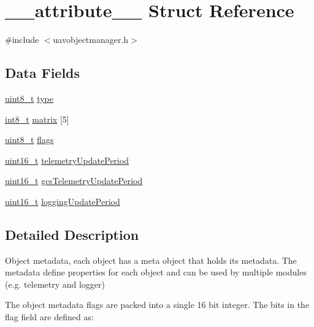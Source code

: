 \hypertarget{struct____attribute____}{\section{\-\_\-\-\_\-attribute\-\_\-\-\_\- Struct Reference}
\label{struct____attribute____}
}


{\ttfamily \#include $<$uavobjectmanager.\-h$>$}

\subsection*{Data Fields}
\begin{DoxyCompactItemize}
\item 
\hyperlink{stdint_8h_aba7bc1797add20fe3efdf37ced1182c5}{uint8\-\_\-t} \hyperlink{struct____attribute_____a30e60959661cf2e3b2dcc52e5d3e9249}{type}
\item 
\hyperlink{stdint_8h_ad566f6541e98b74246db1a3a3a85ad49}{int8\-\_\-t} \hyperlink{struct____attribute_____a443b6e5347cb65e8a297b596be99e467}{matrix} \mbox{[}5\mbox{]}
\item 
\hyperlink{stdint_8h_aba7bc1797add20fe3efdf37ced1182c5}{uint8\-\_\-t} \hyperlink{struct____attribute_____a2c5106312c60da8340d95ea8f201e8f2}{flags}
\item 
\hyperlink{stdint_8h_a273cf69d639a59973b6019625df33e30}{uint16\-\_\-t} \hyperlink{struct____attribute_____a07d69a32a8cbb34c8dc822e7bf30f73e}{telemetry\-Update\-Period}
\item 
\hyperlink{stdint_8h_a273cf69d639a59973b6019625df33e30}{uint16\-\_\-t} \hyperlink{struct____attribute_____a6725d1b44961129705dbb1f209ba7b8d}{gcs\-Telemetry\-Update\-Period}
\item 
\hyperlink{stdint_8h_a273cf69d639a59973b6019625df33e30}{uint16\-\_\-t} \hyperlink{struct____attribute_____a85a81b55d67790a728b95eee989f17ed}{logging\-Update\-Period}
\end{DoxyCompactItemize}


\subsection{Detailed Description}
Object metadata, each object has a meta object that holds its metadata. The metadata define properties for each object and can be used by multiple modules (e.\-g. telemetry and logger)

The object metadata flags are packed into a single 16 bit integer. The bits in the flag field are defined as\-:

